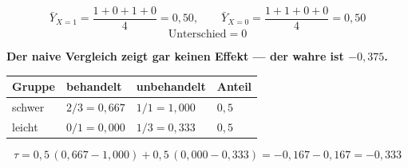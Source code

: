 \begin{aufgabe}
\begin{center}
\begin{minipage}{0.88\textwidth}
\end{minipage}
\end{center}

\[ \bar Y_{X=1} = \frac{1+0+1+0}{4} = 0{,}50, \qquad \bar Y_{X=0} = \frac{1+1+0+0}{4} = 0{,}50 \]
\[ \text{Unterschied} = 0 \]

\begin{center}
\begin{minipage}{0.9\textwidth}
\textbf{Der naive Vergleich zeigt gar keinen Effekt --- der wahre ist $-0{,}375$.}
\end{minipage}
\end{center}

\begin{center}
{\small
\renewcommand{\arraystretch}{1.46}
\begin{tabular}{@{}P{1.8cm}P{2.4cm}P{2.4cm}P{1.6cm}@{}}
\toprule
\textbf{Gruppe} & \textbf{behandelt} & \textbf{unbehandelt} & \textbf{Anteil}\\
\midrule
schwer & $2/3 = 0{,}667$ & $1/1 = 1{,}000$ & $0{,}5$\\
leicht & $0/1 = 0{,}000$ & $1/3 = 0{,}333$ & $0{,}5$\\
\bottomrule
\end{tabular}}
\end{center}

\[ \hat\tau = 0{,}5\,(0{,}667-1{,}000) + 0{,}5\,(0{,}000-0{,}333) = -0{,}167 - 0{,}167 = -0{,}333 \]

\begin{center}
\begin{minipage}{0.88\textwidth}
\end{minipage}
\end{center}
\end{aufgabe}

